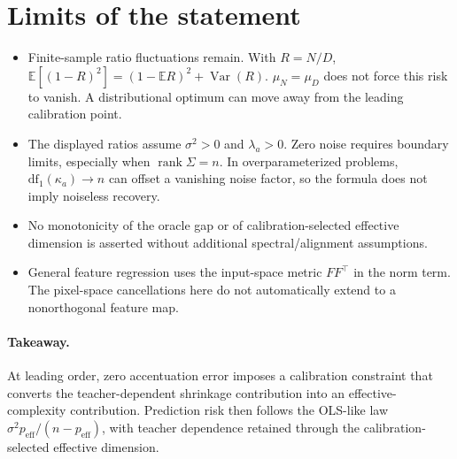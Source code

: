 \documentclass[11pt]{article}
\newcommand{\df}{\mathrm{df}}
\begin{document}
\section{Limits of the statement}
\begin{itemize}
\item Finite-sample ratio fluctuations remain. With $R=N/D$,
$\mathbb E[(1-R)^2]=(1-\mathbb ER)^2+\operatorname{Var}(R)$.
$\mu_N=\mu_D$ does not force this risk to vanish. A distributional optimum
can move away from the leading calibration point.
\item The displayed ratios assume $\sigma^2>0$ and $\lambda_a>0$.
Zero noise requires boundary limits, especially when $\operatorname{rank}\Sigma=n$.
In overparameterized problems, $\df_1(\kappa_a)\to n$ can offset a vanishing
noise factor, so the formula does not imply noiseless recovery.
\item No monotonicity of the oracle gap or of calibration-selected effective
dimension is asserted without additional spectral/alignment assumptions.
\item General feature regression uses the input-space metric $FF^\top$ in
the norm term. The pixel-space cancellations here do not automatically extend
to a nonorthogonal feature map.
\end{itemize}

\paragraph{Takeaway.}
At leading order, zero accentuation error imposes a calibration constraint
that converts the teacher-dependent shrinkage contribution into an
effective-complexity contribution. Prediction risk then follows the OLS-like
law $\sigma^2p_{\mathrm{eff}}/(n-p_{\mathrm{eff}})$, with teacher dependence
retained through the calibration-selected effective dimension.
\end{document}
